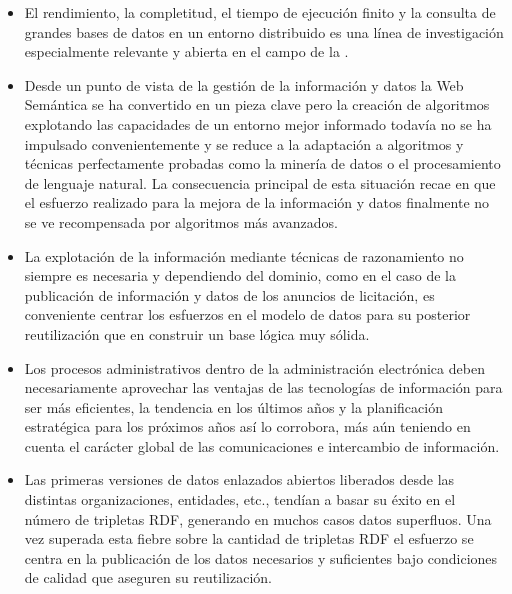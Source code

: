 \begin{itemize}
 \item El rendimiento, la completitud, el tiempo de ejecución finito y la consulta de grandes bases de datos en un entorno distribuido es una línea de investigación especialmente 
relevante y abierta en el campo de la \wod.
 \item Desde un punto de vista de la gestión de la información y datos la Web Semántica se ha convertido en un pieza clave pero 
la creación de algoritmos explotando las capacidades de un entorno mejor informado todavía no se ha impulsado convenientemente 
y se reduce a la adaptación a algoritmos y técnicas perfectamente probadas como la minería de datos o el procesamiento de lenguaje 
natural. La consecuencia principal de esta situación recae en que el esfuerzo realizado para la mejora de la información 
y datos finalmente no se ve recompensada por algoritmos más avanzados.
 \item La explotación de la información mediante técnicas de razonamiento no siempre es necesaria y dependiendo del dominio, como en el caso 
de la publicación de información y datos de los anuncios de licitación, es conveniente centrar los esfuerzos en el modelo de datos 
para su posterior reutilización que en construir un base lógica muy sólida.
\item Los procesos administrativos dentro de la administración electrónica deben necesariamente aprovechar las ventajas 
de las tecnologías de información para ser más eficientes, la tendencia en los últimos años y la planificación estratégica 
para los próximos años así lo corrobora, más aún teniendo en cuenta el carácter global de las comunicaciones e intercambio 
de información.
\item Las primeras versiones de datos enlazados abiertos liberados desde las distintas organizaciones, entidades, etc., tendían 
a basar su éxito en el número de tripletas \gls{RDF}, generando en muchos casos datos superfluos. Una vez superada esta fiebre sobre 
la cantidad de tripletas RDF el esfuerzo se centra en la publicación de los datos necesarios y suficientes bajo condiciones 
de calidad que aseguren su reutilización.
\end{itemize}

